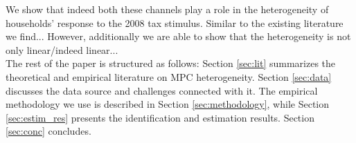 We show that indeed both these channels play a role in the heterogeneity of households' response to the 2008 tax stimulus. Similar to the existing literature we find... However, additionally we are able to show that the heterogeneity is not only linear/indeed linear... \\ 
The rest of the paper is structured as follows: Section \ref{sec:lit} summarizes the theoretical and empirical literature on MPC heterogeneity. Section \ref{sec:data} discusses the data source and challenges connected with it. The empirical methodology we use is described in Section \ref{sec:methodology}, while Section \ref{sec:estim_res} presents the identification and estimation results. Section \ref{sec:conc} concludes.